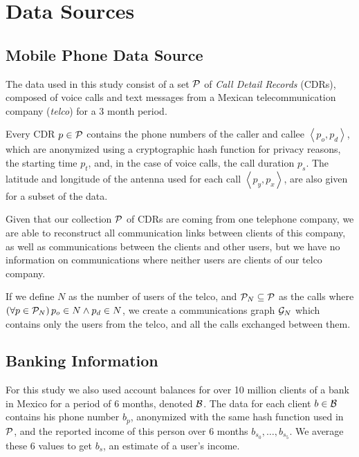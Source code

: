 \section{Data Sources}\label{data_sources}

\subsection{Mobile Phone Data Source}

The data used in this study consist of a set \( \mathcal{P} \) of \textit{Call Detail Records} (CDRs), composed of voice calls and text messages from a Mexican telecommunication company (\textit{telco}) for a 3 month period.

Every CDR \( p \in \mathcal{P} \) contains the phone numbers of the caller and callee \( \left< p_o, p_d \right> \), which are anonymized using a cryptographic hash function for privacy reasons, the starting time \( p_t \), and, in the case of voice calls, the call duration \( p_s \). The latitude and longitude of the antenna used for each call \( \left< p_y, p_x \right> \), are also given for a subset of the data.

Given that our collection \( \mathcal{P} \) of CDRs are coming from one telephone company, we are able to reconstruct all communication links between clients of this company, as well as communications between the clients and other users, but we have no information on communications where neither users are clients of our telco company.

If we define \( N \) as the number of users of the telco, and \( \mathcal{P}_N \subseteq \mathcal{P} \) as the calls where \( \left( \forall p \in \mathcal{P}_N \right) p_o \in N \wedge p_d \in N \), we create a communications graph \( \mathcal{G}_N \) which contains only the users from the telco, and all the calls exchanged between them.


\subsection{Banking Information}

For this study we also used account balances for over 10 million clients of a bank in Mexico for a period of 6 months, denoted \( \mathcal{B} \). The data for each client \( b \in \mathcal{B} \) contains his phone number \( b_p \), anonymized with the same hash function used in \( \mathcal{P} \), and the reported income of this person over 6 months \( b_{s_0}, \ldots, b_{s_5} \). We average these 6 values to get \( b_s \), an estimate of a user's income.

